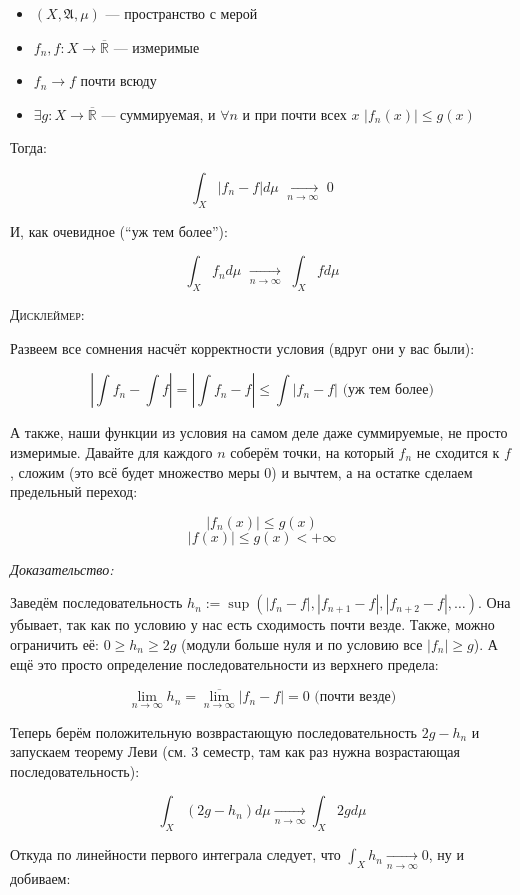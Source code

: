 \documentclass{article}
\def\dbl{\,\,}
\def\rinf{\overline{\mathbb{R}}}
\def\goesto#1{\underset{#1}{\longrightarrow}}
\def\toinf#1{\goesto{#1 \rightarrow \infty}}
\def\ntoinf{\toinf{n}}
\begin{document}
\begin{itemize}
    \item $(X, \mathfrak{A}, \mu)$ --- пространство с мерой
    \item $f_n, f: X \rightarrow \rinf$ --- измеримые
    \item $f_n \rightarrow f$ почти всюду
    \item $\exists g: X \rightarrow \rinf$ --- суммируемая, и $\forall n$ и при почти всех $x \dbl |f_n(x)| \le g(x)$
\end{itemize}

Тогда:

\[\int_{X}|f_n - f| d \mu \dbl \ntoinf \dbl 0\]

И, как очевидное (``уж тем более''):

\[\int_{X} f_n d\mu \dbl \ntoinf \dbl \int_{X} f d\mu\]


\textsc{Дисклеймер:}

Развеем все сомнения насчёт корректности условия (вдруг они у вас были):

\[\left| \int f_n - \int f \right| = \left| \int f_n - f \right| \le \int |f_n - f| \text{ (уж тем более)}\]

А также, наши функции из условия на самом деле даже суммируемые, не просто измеримые. Давайте для каждого $n$ соберём точки, на который $f_n$ не сходится к $f$, сложим (это всё будет множество меры 0) и вычтем, а на остатке сделаем предельный переход:

\[|f_n(x)| \le g(x)\]
\[|f(x)| \le g(x) < +\infty\]

\textit{Доказательство:}

Заведём последовательность $h_n := \sup (|f_n - f|, |f_{n + 1} - f|, |f_{n + 2} - f|, \ldots)$. Она убывает, так как по условию у нас есть сходимость почти везде. Также, можно ограничить её: $0 \ge h_n \ge 2 g$ (модули больше нуля и по условию все $|f_n| \ge g$). А ещё это просто определение последовательности из верхнего предела:

\[\lim_{n \rightarrow \infty} h_n = \overline{\lim_{n \rightarrow \infty}} |f_n - f| = 0 \text{ (почти везде)}\]

Теперь берём положительную возврастающую последовательность $2g - h_n$ и запускаем теорему Леви (см. 3 семестр, там как раз нужна возрастающая последовательность):

\[\int_{X} (2g - h_n) d\mu \ntoinf \int_{X} 2g d\mu\]

Откуда по линейности первого интеграла следует, что $\int_{X} h_n \ntoinf 0$, ну и добиваем:
\end{document}
